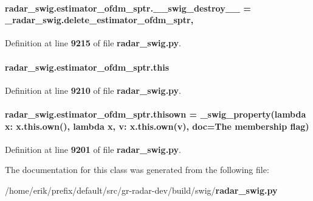 \paragraph[{\+\_\+\+\_\+swig\+\_\+destroy\+\_\+\+\_\+}]{\setlength{\rightskip}{0pt plus 5cm}radar\+\_\+swig.\+estimator\+\_\+ofdm\+\_\+sptr.\+\_\+\+\_\+swig\+\_\+destroy\+\_\+\+\_\+ = \+\_\+radar\+\_\+swig.\+delete\+\_\+estimator\+\_\+ofdm\+\_\+sptr\hspace{0.3cm}{\ttfamily [static]}, {\ttfamily [private]}}\label{classradar__swig_1_1estimator__ofdm__sptr_a37efcc7610aac03234a15b6b5ffa9098}


Definition at line {\bf 9215} of file {\bf radar\+\_\+swig.\+py}.

\paragraph[{this}]{\setlength{\rightskip}{0pt plus 5cm}radar\+\_\+swig.\+estimator\+\_\+ofdm\+\_\+sptr.\+this}\label{classradar__swig_1_1estimator__ofdm__sptr_a06652108d08f4fc5dd87df19452ec963}


Definition at line {\bf 9210} of file {\bf radar\+\_\+swig.\+py}.

\paragraph[{thisown}]{\setlength{\rightskip}{0pt plus 5cm}radar\+\_\+swig.\+estimator\+\_\+ofdm\+\_\+sptr.\+thisown = {\bf \+\_\+swig\+\_\+property}(lambda x\+: x.\+this.\+own(), lambda {\bf x}, v\+: x.\+this.\+own(v), doc=\textquotesingle{}The membership flag\textquotesingle{})\hspace{0.3cm}{\ttfamily [static]}}\label{classradar__swig_1_1estimator__ofdm__sptr_af48ce4be9cae45f5e1eecada1d9072b8}


Definition at line {\bf 9201} of file {\bf radar\+\_\+swig.\+py}.



The documentation for this class was generated from the following file\+:\begin{DoxyCompactItemize}
\item 
/home/erik/prefix/default/src/gr-\/radar-\/dev/build/swig/{\bf radar\+\_\+swig.\+py}\end{DoxyCompactItemize}
